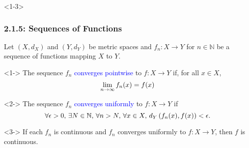 \documentclass[10pt,english,aspectratio=169]{beamer}
\begin{document}
\begin{frame}<1-3>
\frametitle{2.1.5: Sequences of Functions}

Let $(X,d_X)$ and $(Y,d_Y)$ be metric spaces and
$f_n \colon X \to Y$ for $n\in \mathbb{N}$ be a sequence of functions mapping $X$ to $Y$.

\begin{definition}<1->
The sequence $f_n$ \textcolor{blue}{converges pointwise} to $f\colon X \to Y$ if, for all $x \in X$, \vspace{-1.5mm}
\[ \lim_{n\to \infty} f_n (x) = f(x) \vspace*{-0.5mm} \]

\end{definition}

\begin{definition}<2->
The sequence $f_n$ \textcolor{blue}{converges uniformly} to $f \colon X \to Y$ if \vspace{-1.5mm}
\[ \forall \epsilon > 0, \, \exists N\in \mathbb{N}, \, \forall n>N, \, \forall x\in X, \, d_Y \left( f_n(x),f(x) \right) < \epsilon. \vspace*{-0.5mm} \]
\end{definition}

\begin{theorem}<3->
If each $f_n$ is continuous and $f_n$ converges uniformly to $f \colon X \to Y$, then $f$ is continuous.
\end{theorem}


\end{frame}
\end{document}
